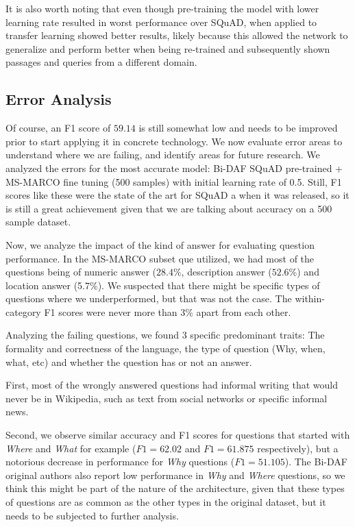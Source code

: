 \documentclass[11pt,a4paper]{article}
\begin{document}
It is also worth noting that even though pre-training the model with lower learning rate resulted in worst performance over SQuAD, when applied to transfer learning showed better results, likely because this allowed the network to generalize and perform better when being re-trained and subsequently shown passages and queries from a different domain.

\subsection {Error Analysis}

Of course, an F1 score of $59.14$ is still somewhat low and needs to be improved prior to start applying it in concrete technology. We now evaluate error areas to understand where we are failing, and identify areas for future research. We analyzed the errors for the most accurate model: Bi-DAF SQuAD pre-trained + MS-MARCO fine tuning (500 samples) with initial learning rate of 0.5. Still, F1 scores like these were the state of the art for SQuAD a when it was released, so it is still a great achievement given that we are talking about accuracy on a 500 sample dataset.

Now, we analyze the impact of the kind of answer for evaluating question performance. In the MS-MARCO subset que utilized, we had most of the questions being of numeric answer ($28.4\%$, description answer ($52.6\%$) and location answer (5.7\%). We suspected that there might be specific types of questions where we underperformed, but that was not the case. The within-category F1 scores were never more than 3\% apart from each other.

Analyzing the failing questions, we found 3 specific predominant traits: The formality and correctness of the language, the type of question (Why, when, what, etc) and whether the question has or not an answer.

First, most of the wrongly answered questions had informal writing that would never be in Wikipedia, such as text from social networks or specific informal news. 

Second, we observe similar accuracy and F1 scores for questions that started with \textit{Where} and \textit{What} for example ($F1=62.02$ and $F1=61.875$ respectively), but a notorious decrease in performance for \textit{Why} questions ($F1 = 51.105$). The Bi-DAF original authors also report low performance in \textit{Why} and \textit{Where} questions, so we think this might be part of the nature of the architecture, given that these types of questions are as common as the other types in the original dataset, but it needs to be subjected to further analysis.
\end{document}
